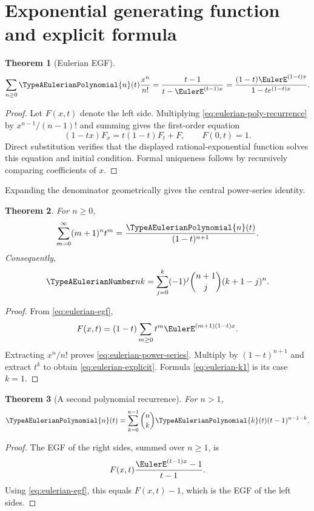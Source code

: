 \documentclass[11pt,a4paper,oneside,openany]{book}
\newtheorem{theorem}{Theorem}[chapter]
\theoremstyle{definition}
\theoremstyle{remark}
\begin{document}
\section{Exponential generating function and explicit formula}
\begin{theorem}[Eulerian EGF]\label{thm:eulerian-egf}
\begin{equation}\label{eq:eulerian-egf}
 \sum_{n\ge0}\TypeAEulerianPolynomial{n}(t)\frac{x^n}{n!}
 =\frac{t-1}{t-\EulerE^{(t-1)x}}
 =\frac{(1-t)\EulerE^{(1-t)x}}{1-te^{(1-t)x}}.
\end{equation}
\end{theorem}
\begin{proof}
Let $F(x,t)$ denote the left side.  Multiplying
\eqref{eq:eulerian-poly-recurrence} by $x^{n-1}/(n-1)!$ and summing gives the
first-order equation
\[
 (1-tx)F_x=t(1-t)F_t+F,
 \qquad F(0,t)=1.
\]
Direct substitution verifies that the displayed rational-exponential function
solves this equation and initial condition.  Formal uniqueness follows by
recursively comparing coefficients of $x$.
\end{proof}

Expanding the denominator geometrically gives the central power-series identity.
\begin{theorem}\label{thm:eulerian-power-series}
For $n\ge0$,
\begin{equation}\label{eq:eulerian-power-series}
 \sum_{m=0}^{\infty}(m+1)^n t^m
 =\frac{\TypeAEulerianPolynomial{n}(t)}{(1-t)^{n+1}}.
\end{equation}
Consequently,
\begin{equation}\label{eq:eulerian-explicit}
 \TypeAEulerianNumber nk=\sum_{j=0}^{k}(-1)^j\binom{n+1}{j}(k+1-j)^n.
\end{equation}
\end{theorem}
\begin{proof}
From \eqref{eq:eulerian-egf},
\[
 F(x,t)=(1-t)\sum_{m\ge0}t^m \EulerE^{(m+1)(1-t)x}.
\]
Extracting $x^n/n!$ proves \eqref{eq:eulerian-power-series}.  Multiply by
$(1-t)^{n+1}$ and extract $t^k$ to obtain
\eqref{eq:eulerian-explicit}.  Formula \eqref{eq:eulerian-k1} is its case $k=1$.
\end{proof}

\begin{theorem}[A second polynomial recurrence]\label{thm:eulerian-binomial-recurrence}
For $n>1$,
\begin{equation}\label{eq:eulerian-binomial-recurrence}
 \TypeAEulerianPolynomial{n}(t)=\sum_{k=0}^{n-1}\binom nk \TypeAEulerianPolynomial{k}(t)(t-1)^{n-1-k}.
\end{equation}
\end{theorem}
\begin{proof}
The EGF of the right sides, summed over $n\ge1$, is
\[
 F(x,t)\frac{\EulerE^{(t-1)x}-1}{t-1}.
\]
Using \eqref{eq:eulerian-egf}, this equals $F(x,t)-1$, which is the EGF of the
left sides.
\end{proof}
\end{document}
